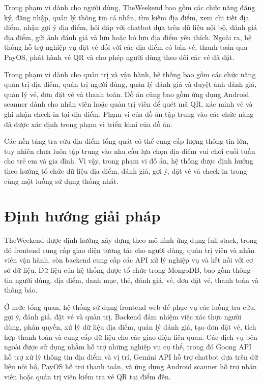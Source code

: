 \documentclass[../DoAn.tex]{subfiles}
\begin{document}
Trong phạm vi dành cho người dùng, TheWeekend bao gồm các chức năng đăng ký, đăng nhập, quản lý thông tin cá nhân, tìm kiếm địa điểm, xem chi tiết địa điểm, nhận gợi ý địa điểm, hỏi đáp với chatbot dựa trên dữ liệu nội bộ, đánh giá địa điểm, gửi ảnh đánh giá và lưu hoặc bỏ lưu địa điểm yêu thích. Ngoài ra, hệ thống hỗ trợ nghiệp vụ đặt vé đối với các địa điểm có bán vé, thanh toán qua PayOS, phát hành vé QR và cho phép người dùng theo dõi các vé đã đặt.

Trong phạm vi dành cho quản trị và vận hành, hệ thống bao gồm các chức năng quản trị địa điểm, quản trị người dùng, quản lý đánh giá và duyệt ảnh đánh giá, quản lý vé, đơn đặt vé và thanh toán. Đồ án cũng bao gồm ứng dụng Android scanner dành cho nhân viên hoặc quản trị viên để quét mã QR, xác minh vé và ghi nhận check-in tại địa điểm. Phạm vi của đồ án tập trung vào các chức năng đã được xác định trong phạm vi triển khai của đồ án.

Các nền tảng tra cứu địa điểm tổng quát có thể cung cấp lượng thông tin lớn, tuy nhiên chưa luôn tập trung vào nhu cầu lựa chọn địa điểm vui chơi cuối tuần cho trẻ em và gia đình. Vì vậy, trong phạm vi đồ án, hệ thống được định hướng theo hướng tổ chức dữ liệu địa điểm, đánh giá, gợi ý, đặt vé và check-in trong cùng một luồng sử dụng thống nhất.

\section{Định hướng giải pháp}

TheWeekend được định hướng xây dựng theo mô hình ứng dụng full-stack, trong đó frontend cung cấp giao diện tương tác cho người dùng, quản trị viên và nhân viên vận hành, còn backend cung cấp các API xử lý nghiệp vụ và kết nối với cơ sở dữ liệu. Dữ liệu của hệ thống được tổ chức trong MongoDB, bao gồm thông tin người dùng, địa điểm, danh mục, thẻ, đánh giá, vé, đơn đặt vé, thanh toán và thông báo.

Ở mức tổng quan, hệ thống sử dụng frontend web để phục vụ các luồng tra cứu, gợi ý, đánh giá, đặt vé và quản trị. Backend đảm nhiệm việc xác thực người dùng, phân quyền, xử lý dữ liệu địa điểm, quản lý đánh giá, tạo đơn đặt vé, tích hợp thanh toán và cung cấp dữ liệu cho các giao diện liên quan. Các dịch vụ bên ngoài được sử dụng nhằm hỗ trợ những nghiệp vụ cụ thể, trong đó Goong API hỗ trợ xử lý thông tin địa điểm và vị trí, Gemini API hỗ trợ chatbot dựa trên dữ liệu nội bộ, PayOS hỗ trợ thanh toán, và ứng dụng Android scanner hỗ trợ nhân viên hoặc quản trị viên kiểm tra vé QR tại điểm đến.
\end{document}
